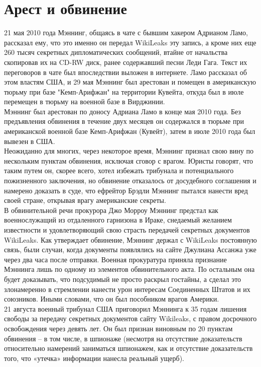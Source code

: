 ﻿\section{Арест и обвинение}
21 мая 2010 года Мэннинг, общаясь в чате с бывшим хакером Адрианом Ламо, рассказал ему, что это именно он передал WikiLeaks эту запись, а кроме них еще 260 тысяч секретных дипломатических сообщений, втайне от начальства скопировав их на CD-RW диск, ранее содержавший песни Леди Гага. Текст их переговоров в чате был впоследствии выложен в интернете. Ламо рассказал об этом властям США, и 29 мая Мэннинг был арестован и помещен в американскую тюрьму при базе "Кемп-Арифжан" на территории Кувейта, откуда был в июле перемещен в тюрьму на военной базе в Вирджинии. \cite{People} \cite{Manning} \\
Мэннинг был арестован по доносу Адриана Ламо в конце мая 2010 года. Без предъявления обвинения в течение двух месяцев он содержался в тюрьме при американской военной базе Кемп-Арифжан (Кувейт), затем в июле 2010 года был вывезен в США. \cite{Manning} \\
Неожиданно для многих, через некоторое время, Мэннинг признал свою вину по нескольким пунктам обвинения, исключая сговор с врагом. Юристы говорят, что таким путем он, скорее всего, хотел избежать трибунала и потенциального пожизненного заключения, но обвинение отказалось от досудебного соглашения и намерено доказать в суде, что ефрейтор Брэдли Мэннинг пытался нанести вред своей стране, открывая врагу американские секреты. \\
В обвинительной речи прокурора Джо Морроу Мэннинг предстал как военнослужащий из отдаленного гарнизона в Ираке, снедаемый желанием известности и удовлетворяющий свою страсть передачей секретных документов WikiLeaks. Как утверждает обвинение, Мэннинг держал с WikiLeaks постоянную связь, были случаи, когда документы появлялись на сайте Джулиана Ассанжа уже через два часа после отправки. \cite{Dream}
Военная прокуратура приняла признание Мэннинга лишь по одному из элементов обвинительного акта. По остальным она будет доказывать, что подсудимый не просто раскрыл гостайны, а сделал это злонамеренно в стремлении нанести урон интересам Соединенных Штатов и их союзников. Иными словами, что он был пособником врагов Америки. \cite{Sliv} \\
21 августа военный трибунал США приговорил Мэннинга к 35 годам лишения свободы за передачу секретных документов сайту Wikileaks, с правом досрочного освобождения через девять лет. Он был признан виновным по 20 пунктам обвинения – в том числе, в шпионаже (несмотря на отсутствие доказательств относительно намерений заниматься шпионажем, как и отсутствие доказательств того, что «утечка» информации нанесла реальный ущерб). \cite{Manning} \cite{Argument}
